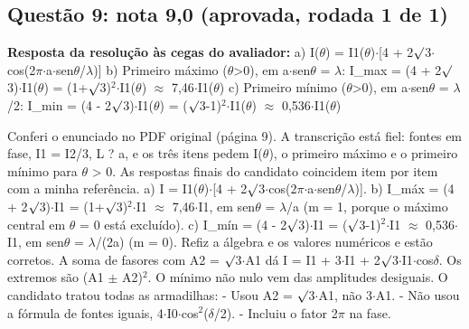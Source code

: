 \documentclass{article}%
\begin{document}
\subsection*{Questão 9: nota 9,0 (aprovada, rodada 1 de 1)}%
\textbf{Resposta da resolução às cegas do avaliador:} a) I($\theta$) = I1($\theta$)$\cdot${[}4 + 2$\surd$3$\cdot$cos(2$\pi$$\cdot$a$\cdot$sen$\theta$/$\lambda$){]}\newline%
b) Primeiro máximo ($\theta$>0), em a$\cdot$sen$\theta$ = $\lambda$: I\_max = (4 + 2$\surd$3)$\cdot$I1($\theta$) = (1+$\surd$3)$^2$$\cdot$I1($\theta$) $\approx$ 7,46$\cdot$I1($\theta$)\newline%
c) Primeiro mínimo ($\theta$>0), em a$\cdot$sen$\theta$ = $\lambda$/2: I\_min = (4 - 2$\surd$3)$\cdot$I1($\theta$) = ($\surd$3-1)$^2$$\cdot$I1($\theta$) $\approx$ 0,536$\cdot$I1($\theta$)\par %
Conferi o enunciado no PDF original (página 9). A transcrição está fiel: fontes em fase, I1 = I2/3, L ? a, e os três itens pedem I($\theta$), o primeiro máximo e o primeiro mínimo para $\theta$ > 0. As respostas finais do candidato coincidem item por item com a minha referência.\newline%
\newline%
a) I = I1($\theta$)$\cdot${[}4 + 2$\surd$3$\cdot$cos(2$\pi$$\cdot$a$\cdot$sen$\theta$/$\lambda$){]}.\newline%
b) I\_máx = (4 + 2$\surd$3)$\cdot$I1 = (1+$\surd$3)$^2$$\cdot$I1 $\approx$ 7,46$\cdot$I1, em sen$\theta$ = $\lambda$/a (m = 1, porque o máximo central em $\theta$ = 0 está excluído).\newline%
c) I\_mín = (4 - 2$\surd$3)$\cdot$I1 = ($\surd$3-1)$^2$$\cdot$I1 $\approx$ 0,536$\cdot$I1, em sen$\theta$ = $\lambda$/(2a) (m = 0).\newline%
\newline%
Refiz a álgebra e os valores numéricos e estão corretos. A soma de fasores com A2 = $\surd$3$\cdot$A1 dá I = I1 + 3$\cdot$I1 + 2$\surd$3$\cdot$I1$\cdot$cos$\delta$. Os extremos são (A1 $\pm$ A2)$^2$. O mínimo não nulo vem das amplitudes desiguais.\newline%
\newline%
O candidato tratou todas as armadilhas:\newline%
{-} Usou A2 = $\surd$3$\cdot$A1, não 3$\cdot$A1.\newline%
{-} Não usou a fórmula de fontes iguais, 4$\cdot$I0$\cdot$cos$^2$($\delta$/2).\newline%
{-} Incluiu o fator 2$\pi$ na fase.\newline%
\end{document}
